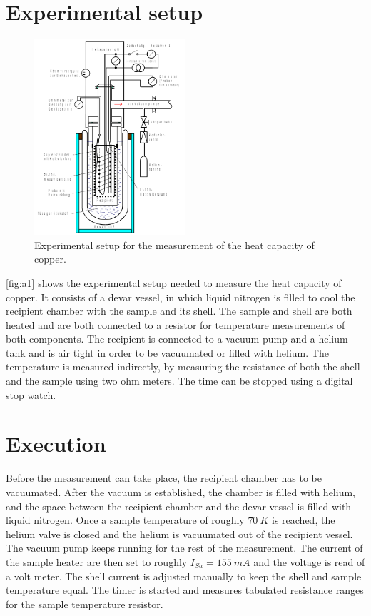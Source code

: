 \section{Experimental setup}
\label{sec:Aufbau}
\begin{figure}[H]
    \centering
    \includegraphics[width=0.5\textwidth]{aufbv47.pdf}
    \caption{Experimental setup for the measurement of the heat capacity of copper. \cite{v47}}
    \label{fig:a1}
\end{figure}
\noindent
\autoref{fig:a1} shows the experimental setup needed to measure the heat capacity of copper. It consists of a devar vessel, in which liquid nitrogen is filled to cool the recipient chamber with the sample and its shell. The sample and shell are both heated and are both connected to a resistor for temperature measurements of both components. The recipient is connected to a vacuum pump and a helium tank and is air tight in order to be vacuumated or filled with helium. The temperature is measured indirectly, by measuring the resistance of both the shell and the sample using two ohm meters. The time can be stopped using a digital stop watch.
\section{Execution}
\label{sec:Durchführung}
Before the measurement can take place, the recipient chamber has to be vacuumated. After the vacuum is established, the chamber is filled with helium, and the space between the recipient chamber and the devar vessel is filled with liquid nitrogen. Once a sample temperature of roughly $\SI{70}{K}$ is reached, the helium valve is closed and the helium is vacuumated out of the recipient vessel. The vacuum pump keeps running for the rest of the measurement. The current of the sample heater are then set to roughly $I_{Sa} = \SI{155}{mA}$ and the voltage is read of a volt meter. The shell current is adjusted manually to keep the shell and sample temperature equal. The timer is started and measures tabulated resistance ranges for the sample temperature resistor.

\newpage